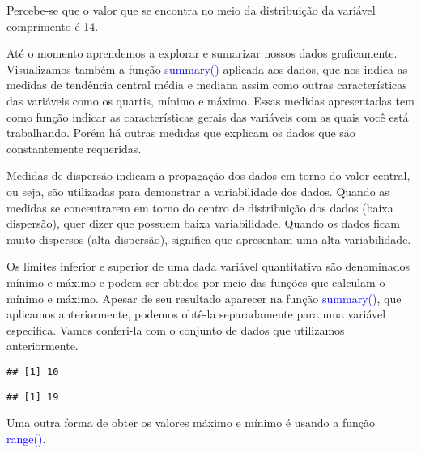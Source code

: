 \documentclass[14pt,titlepage, oneside, openany, a4paper]{book}
\newenvironment{Shaded}{\begin{snugshade}}{\end{snugshade}}
\newcommand{\KeywordTok}[1]{\textcolor[rgb]{0.13,0.29,0.53}{\textbf{#1}}}
\newcommand{\NormalTok}[1]{#1}
\newcommand{\OperatorTok}[1]{\textcolor[rgb]{0.81,0.36,0.00}{\textbf{#1}}}
\begin{document}
Percebe-se que o valor que se encontra no meio da distribuição da variável comprimento é 14.

Até o momento aprendemos a explorar e sumarizar nossos dados graficamente. Visualizamos também a função \textcolor{blue}{summary()} aplicada aos dados, que nos indica as medidas de tendência central média e mediana assim como outras características das variáveis como os quartis, mínimo e máximo. Essas medidas apresentadas tem como função indicar as características gerais das variáveis com as quais você está trabalhando. Porém há outras medidas que explicam os dados que são constantemente requeridas.

Medidas de dispersão indicam a propagação dos dados em torno do valor central, ou seja, são utilizadas para demonstrar a variabilidade dos dados. Quando as medidas se concentrarem em torno do centro de distribuição dos dados (baixa dispersão), quer dizer que possuem baixa variabilidade. Quando os dados ficam muito dispersos (alta dispersão), significa que apresentam uma alta variabilidade.

Os limites inferior e superior de uma dada variável quantitativa são denominados mínimo e máximo e podem ser obtidos por meio das funções que calculam o mínimo e máximo. Apesar de seu resultado aparecer na função \textcolor{blue}{summary()}, que aplicamos anteriormente, podemos obtê-la separadamente para uma variável especifica. Vamos conferi-la com o conjunto de dados que utilizamos anteriormente.

\begin{Shaded}
\end{Shaded}

\begin{verbatim}
## [1] 10
\end{verbatim}

\begin{Shaded}
\end{Shaded}

\begin{verbatim}
## [1] 19
\end{verbatim}

Uma outra forma de obter os valores máximo e mínimo é usando a função \textcolor{blue}{range()}.
\end{document}

